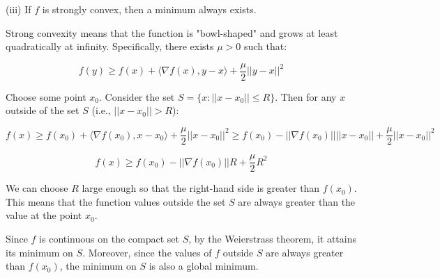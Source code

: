 \documentclass{article}
\begin{document}
(iii) If $f$ is strongly convex, then a minimum always exists.

Strong convexity means that the function is "bowl-shaped" and grows at least quadratically at infinity.  Specifically, there exists $\mu > 0$ such that:

$$f(y) \geq f(x) + \langle \nabla f(x), y - x \rangle + \frac{\mu}{2} ||y - x||^2$$

Choose some point $x_0$.  Consider the set $S = \{x : ||x - x_0|| \leq R \}$. Then for any $x$ outside of the set $S$ (i.e., $||x - x_0|| > R$):

$$f(x) \geq f(x_0) + \langle \nabla f(x_0), x - x_0 \rangle + \frac{\mu}{2} ||x - x_0||^2 \geq f(x_0) - ||\nabla f(x_0)|| ||x - x_0|| + \frac{\mu}{2} ||x - x_0||^2$$

$$f(x) \geq f(x_0) - ||\nabla f(x_0)|| R + \frac{\mu}{2} R^2$$

We can choose $R$ large enough so that the right-hand side is greater than $f(x_0)$. This means that the function values outside the set $S$ are always greater than the value at the point $x_0$.

Since $f$ is continuous on the compact set $S$, by the Weierstrass theorem, it attains its minimum on $S$. Moreover, since the values of $f$ outside $S$ are always greater than $f(x_0)$, the minimum on $S$ is also a global minimum.
\end{document}
